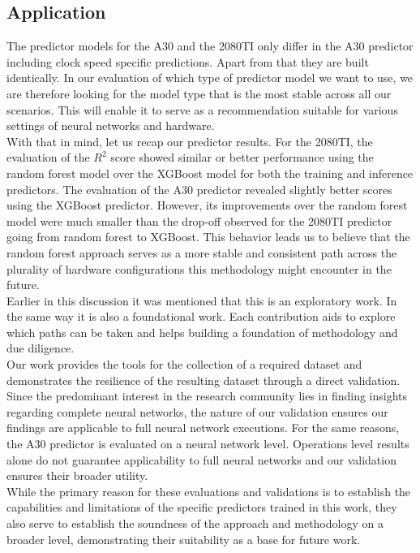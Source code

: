 \subsection{Application}
The predictor models for the A30 and the 2080TI only differ in the A30 predictor including clock speed specific predictions. Apart from that they are built identically. In our evaluation of which type of predictor model we want to use, we are therefore looking for the model type that is the most stable across all our scenarios. This will enable it to serve as a recommendation suitable for various settings of neural networks and hardware. \\
With that in mind, let us recap our predictor results. For the 2080TI, the evaluation of the $R^2$ score showed similar or better performance using the random forest model over the XGBoost model for both the training and inference predictors. The evaluation of the A30 predictor revealed slightly better scores using the XGBoost predictor. However, its improvements over the random forest model were much smaller than the drop-off observed for the 2080TI predictor going from random forest to XGBoost. This behavior leads us to believe that the random forest approach serves as a more stable and consistent path across the plurality of hardware configurations this methodology might encounter in the future. \\
Earlier in this discussion it was mentioned that this is an exploratory work. In the same way it is also a foundational work. Each contribution aids to explore which paths can be taken and helps building a foundation of methodology and due diligence. \\
Our work provides the tools for the collection of a required dataset and demonstrates the resilience of the resulting dataset through a direct validation. Since the predominant interest in the research community lies in finding insights regarding complete neural networks, the nature of our validation ensures our findings are applicable to full neural network executions. For the same reasons, the A30 predictor is evaluated on a neural network level. Operations level results alone do not guarantee applicability to full neural networks and our validation ensures their broader utility. \\
While the primary reason for these evaluations and validations is to establish the capabilities and limitations of the specific predictors trained in this work, they also serve to establish the soundness of the approach and methodology on a broader level, demonstrating their suitability as a base for future work.


